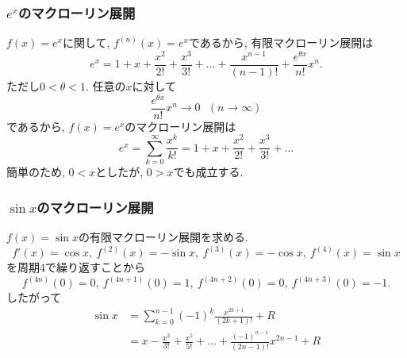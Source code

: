 







\begin{frame}
\frametitle{$e^x$のマクローリン展開}

$f(x)=e^x$に関して, $f^{(n)}(x)=e^x$であるから, 有限マクローリン展開は
$$
e^x=1+x+\frac{x^2}{2!}+\frac{x^3}{3!}+\dots+\frac{x^{n-1}}{(n-1)!}+\frac{e^{\theta x}}{n!}x^n. 
$$
ただし$0<\theta < 1$. 
任意の$x$に対して
$$
\frac{e^{\theta x}}{n!}x^n \to 0 \ \ \ (n \to \infty)
$$
であるから, $f(x)=e^x$のマクローリン展開は
$$
e^x= \sum_{k=0}^{\infty}\frac{x^k}{k!}
=1+x+\frac{x^2}{2!}+\frac{x^3}{3!}+\dots
$$
簡単のため, $0<x$としたが, $0>x$でも成立する.  
\end{frame}






\begin{frame}
\frametitle{$\sin x$のマクローリン展開}

$f(x)=\sin x$の有限マクローリン展開を求める. 
$$
f'(x)=\cos x, \ f^{(2)}(x)=-\sin x, \ f^{(3)}(x)=-\cos x, \ f^{(4)}(x)=\sin x
$$
を周期$4$で繰り返すことから
$$
 f^{(4n)}(0)=0, \ f^{(4n+1)}(0)=1, \ f^{(4n+2)}(0)=0, \ f^{(4n+3)}(0)=-1. 
$$
したがって
\begin{align*}
\sin x & = \sum_{k=0}^{n-1}(-1)^k\frac{x^{2k+1}}{(2k+1)!}+R \\
& = x-\frac{x^3}{3!}+\frac{x^5}{5!}+\dots+\frac{(-1)^{n-1}}{(2n-1)!}x^{2n-1}+R
\end{align*}
	

\end{frame}







